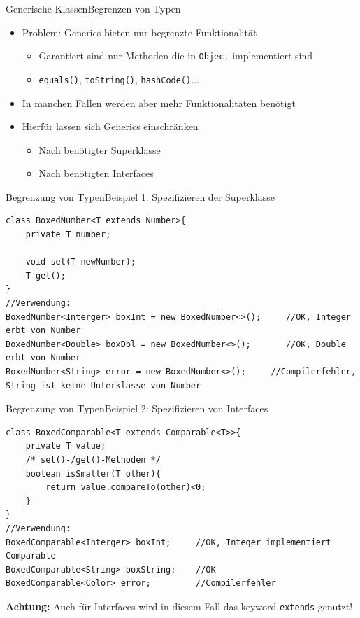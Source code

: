 \begin{frame}{Generische Klassen}{Begrenzen von Typen}
    \begin{itemize}
        \item Problem: Generics bieten nur begrenzte Funktionalität
        \begin{itemize}
            \item Garantiert sind nur Methoden die in \texttt{Object} implementiert sind
            \item \texttt{equals()}, \texttt{toString()}, \texttt{hashCode()}...
        \end{itemize}
        \item In manchen Fällen werden aber mehr Funktionalitäten benötigt
        \item Hierfür lassen sich Generics einschränken
        \begin{itemize}
            \item Nach benötigter Superklasse
            \item Nach benötigten Interfaces
        \end{itemize}
    \end{itemize}
\end{frame}

\begin{frame}[fragile]{Begrenzung von Typen}{Beispiel 1: Spezifizieren der Superklasse}
\lstset{style=java}
\begin{lstlisting}
class BoxedNumber<T extends Number>{
    private T number;
    
    void set(T newNumber);
    T get();
}
//Verwendung:
BoxedNumber<Interger> boxInt = new BoxedNumber<>();     //OK, Integer erbt von Number
BoxedNumber<Double> boxDbl = new BoxedNumber<>();       //OK, Double erbt von Number
BoxedNumber<String> error = new BoxedNumber<>();     //Compilerfehler, String ist keine Unterklasse von Number
\end{lstlisting}
\end{frame}

\begin{frame}[fragile]{Begrenzung von Typen}{Beispiel 2: Spezifizieren von Interfaces}
\lstset{style=java}
\begin{lstlisting}
class BoxedComparable<T extends Comparable<T>>{
    private T value;
    /* set()-/get()-Methoden */
    boolean isSmaller(T other){
        return value.compareTo(other)<0;
    }
}
//Verwendung:
BoxedComparable<Interger> boxInt;     //OK, Integer implementiert Comparable
BoxedComparable<String> boxString;    //OK
BoxedComparable<Color> error;         //Compilerfehler
\end{lstlisting}
\textbf{Achtung:} Auch für Interfaces wird in diesem Fall das keyword \texttt{extends} genutzt!
\end{frame}

